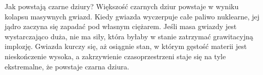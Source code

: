 \begin{frame}{Jak powstają czarne dziury?}
Większość czarnych dziur powstaje w wyniku kolapsu masywnych gwiazd. Kiedy gwiazda wyczerpuje całe paliwo nuklearne, jej jądro zaczyna się zapadać pod własnym ciężarem. Jeśli masa gwiazdy jest wystarczająco duża, nie ma siły, która byłaby w stanie zatrzymać grawitacyjną implozję. Gwiazda kurczy się, aż osiągnie stan, w którym gęstość materii jest nieskończenie wysoka, a zakrzywienie czasoprzestrzeni staje się na tyle ekstremalne, że powstaje czarna dziura.
\end{frame}
